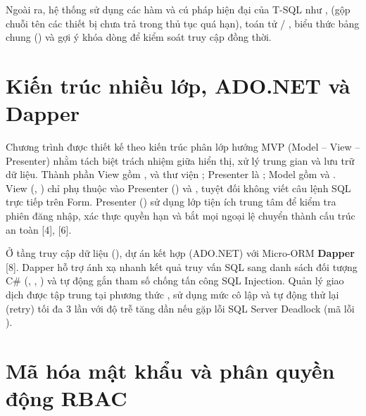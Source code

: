 Ngoài ra, hệ thống sử dụng các hàm và cú pháp hiện đại của T-SQL như ,  (gộp chuỗi tên các thiết bị chưa trả trong thủ tục quá hạn), toán tử  / , biểu thức bảng chung  () và gợi ý khóa dòng  để kiểm soát truy cập đồng thời.


\section{Kiến trúc nhiều lớp, ADO.NET và Dapper}

Chương trình được thiết kế theo kiến trúc phân lớp hướng MVP (Model – View – Presenter) nhằm tách biệt trách nhiệm giữa hiển thị, xử lý trung gian và lưu trữ dữ liệu. Thành phần View gồm ,  và thư viện ; Presenter là ; Model gồm  và . View (, ) chỉ phụ thuộc vào Presenter () và , tuyệt đối không viết câu lệnh SQL trực tiếp trên Form. Presenter () sử dụng lớp tiện ích trung tâm  để kiểm tra phiên đăng nhập, xác thực quyền hạn và bắt mọi ngoại lệ chuyển thành cấu trúc  an toàn [4], [6].


Ở tầng truy cập dữ liệu (), dự án kết hợp  (ADO.NET) với Micro-ORM \textbf{Dapper} [8]. Dapper hỗ trợ ánh xạ nhanh kết quả truy vấn SQL sang danh sách đối tượng C\# (, , ) và tự động gắn tham số chống tấn công SQL Injection. Quản lý giao dịch được tập trung tại phương thức , sử dụng mức cô lập  và tự động thử lại (retry) tối đa 3 lần với độ trễ tăng dần nếu gặp lỗi SQL Server Deadlock (mã lỗi ).


\section{Mã hóa mật khẩu và phân quyền động RBAC}

